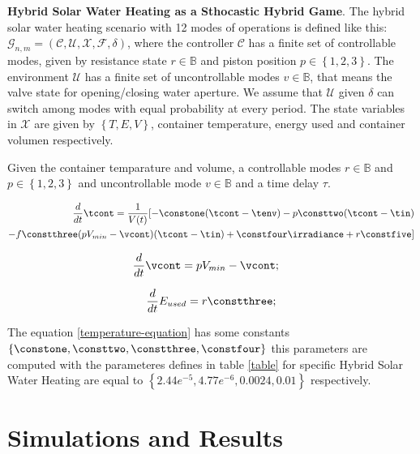 \newpage

\textbf{Hybrid Solar Water Heating as a Sthocastic Hybrid Game}.
The hybrid solar water heating scenario with 12 modes of operations is
defined  like this: $\mathcal{G}_{n,m} = (\mathcal{C,U,X,F},\delta)$, 
where the controller $\mathcal{C}$ has a finite set of controllable modes,
given by resistance state ${r \in \mathbb{B}}$ and piston position $p \in 
\left\lbrace1,2,3\right\rbrace $. The environment $\mathcal{U}$ has a finite  
set of uncontrollable modes $v \in \mathbb{B} $, that means the valve state 
for opening/closing water aperture. We assume that $\mathcal{U}$ given
$\delta$ can switch among modes with equal probability at every period. 
The state variables in $\mathcal{X}$ are given by $\left\lbrace
T,E,V \right\rbrace $, container temperature, energy used and container volumen
respectively.

Given the container temparature and volume, a controllable modes $r \in \mathbb{B}$
and $p \in \left\lbrace1,2,3\right\rbrace $ and uncontrollable mode
$v \in \mathbb{B} $ and a time delay $\tau$.

\begin{equation}
    \begin{aligned}
\frac{d}{dt}\tcont = \frac{1}{V(t)} [ -\constone(\tcont-\tenv)
- p \consttwo(\tcont-\tin) \\
- f \constthree(pV_{min} - \vcont)(\tcont-\tin)
+ \constfour\irradiance+ 
r \constfive ]
    \end{aligned}
\label{temperature-equation}    
\end{equation}

\begin{equation}
\frac{d}{dt}\vcont = pV_{min} - \vcont; \quad
\label{volume-equation}
\end{equation}

\begin{equation} 
\frac{d}{dt}E_{used} =  r \constthree ;
\label{Energy-equation}
\end{equation}

The equation \ref{temperature-equation} has some constants $\left\lbrace 
\constone, \consttwo, \constthree, \constfour \right\rbrace $ this
parameters are computed with the parameteres defines in table \ref{table} for specific Hybrid Solar Water Heating
are equal to $\left\lbrace 2.44e^{-5},  4.77e^{-6}
, 0.0024, 0.01  \right\rbrace$ respectively.


\section{Simulations and Results}

